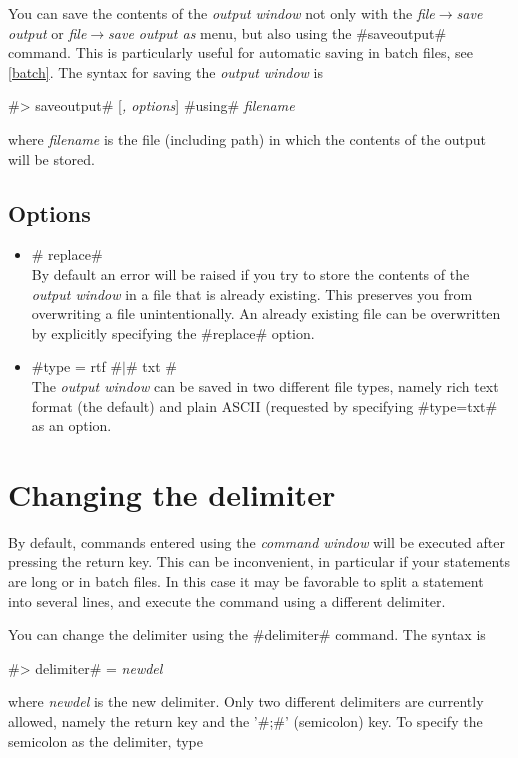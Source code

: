 You can save the contents of the {\em output window} not only with the {\em file$\rightarrow$save output} or {\em
file$\rightarrow$save output as} menu, but also using the #saveoutput# command. This is particularly useful for automatic
saving in batch files, see \autoref{batch}. The syntax for saving the {\em output window} is

#> saveoutput# [{\em , options}] #using# {\em filename}

where {\em filename} is the file (including path) in which the contents of the output will be stored.

\subsection*{Options}

\begin{itemize}
\item # replace# \\
By default an error will be raised if you try to store the contents of the {\em output window} in a file that is already
existing. This preserves you from overwriting a file unintentionally. An already existing file can be overwritten by
explicitly specifying the #replace# option.
\item #type = rtf #$|$# txt # \\
The {\em output window} can be saved in two different file types, namely rich text format (the default) and plain ASCII
(requested by specifying #type=txt# as an option.
\end{itemize}

\section{Changing the delimiter}
\label{delimiter} 

By default, commands entered using the {\em command window} will be executed after pressing the return key. This can be
inconvenient, in particular if your statements are long or in batch files. In this case it may be favorable to split a
statement into several lines, and execute the command using a different delimiter.

You can change the delimiter using the #delimiter# command. The syntax is

#> delimiter# = {\em newdel}

where {\em newdel} is the new delimiter. Only two different delimiters are currently allowed, namely the return key and the
'#;#' (semicolon) key. To specify the semicolon as the delimiter, type

